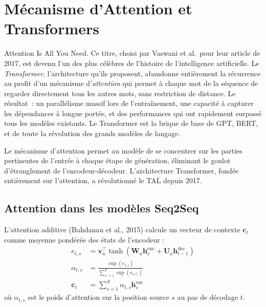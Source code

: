 \chapter{M\'ecanisme d'Attention et Transformers}
\label{ch:attention}

\og Attention Is All You Need. \fg Ce titre, choisi par Vaswani et al.\ pour leur article de 2017, est devenu l'un des plus c\'el\`ebres de l'histoire de l'intelligence artificielle. Le \emph{Transformer}, l'architecture qu'ils proposent, abandonne enti\`erement la r\'ecurrence au profit d'un m\'ecanisme d'\emph{attention} qui permet \`a chaque mot de la s\'equence de \og regarder \fg directement tous les autres mots, sans restriction de distance. Le r\'esultat~: un parall\'elisme massif lors de l'entra\^inement, une capacit\'e \`a capturer les d\'ependances \`a longue port\'ee, et des performances qui ont rapidement surpass\'e tous les mod\`eles existants. Le Transformer est la brique de base de GPT, BERT, et de toute la r\'evolution des grands mod\`eles de langage.

\begin{intuition}[title=\textbf{Attention : regarder l\`a o\`u c'est pertinent}]
Le m\'ecanisme d'attention permet au mod\`ele de se concentrer sur les parties
pertinentes de l'entr\'ee \`a chaque \'etape de g\'en\'eration, \'eliminant le
goulot d'\'etranglement de l'encodeur-d\'ecodeur. L'architecture Transformer,
fond\'ee enti\`erement sur l'attention, a r\'evolutionn\'e le TAL depuis 2017.
\end{intuition}

\section{Attention dans les mod\`eles Seq2Seq}
\label{sec:att:seq2seq}

\begin{definition}
L'attention additive (Bahdanau et al., 2015) calcule un vecteur de contexte
$\mathbf{c}_t$ comme moyenne pond\'er\'ee des \'etats de l'encodeur :
\begin{align}
e_{t,s} &= \mathbf{v}_a^\top \tanh(\mathbf{W}_a \mathbf{h}_s^{\text{enc}} + \mathbf{U}_a \mathbf{h}_{t-1}^{\text{dec}}) \\
\alpha_{t,s} &= \frac{\exp(e_{t,s})}{\sum_{s'=1}^{S} \exp(e_{t,s'})} \\
\mathbf{c}_t &= \sum_{s=1}^{S} \alpha_{t,s} \mathbf{h}_s^{\text{enc}}
\end{align}
o\`u $\alpha_{t,s}$ est le poids d'attention sur la position source $s$ au
pas de d\'ecodage $t$.
\end{definition}

